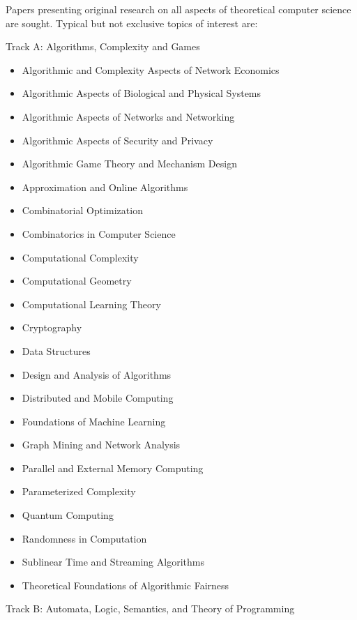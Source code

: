 \documentclass[prodmode,acmtecs]{acmsmall} %
\begin{document}
\begin{itemize}
  Papers presenting original research on all aspects of theoretical computer science are sought. Typical but not exclusive topics of interest are: 
 
  Track A: Algorithms, Complexity and Games 
 
\begin{itemize}\item  Algorithmic and Complexity Aspects of Network Economics
\item  Algorithmic Aspects of Biological and Physical Systems
\item  Algorithmic Aspects of Networks and Networking
\item  Algorithmic Aspects of Security and Privacy
\item  Algorithmic Game Theory and Mechanism Design
\item  Approximation and Online Algorithms
\item  Combinatorial Optimization
\item  Combinatorics in Computer Science
\item  Computational Complexity
\item  Computational Geometry
\item  Computational Learning Theory
\item  Cryptography
\item  Data Structures
\item  Design and Analysis of Algorithms
\item  Distributed and Mobile Computing
\item  Foundations of Machine Learning
\item  Graph Mining and Network Analysis
\item  Parallel and External Memory Computing
\item  Parameterized Complexity
\item  Quantum Computing
\item  Randomness in Computation
\item  Sublinear Time and Streaming Algorithms
\item  Theoretical Foundations of Algorithmic Fairness 
\end{itemize} 
  Track B: Automata, Logic, Semantics, and Theory of Programming 
 

\end{itemize}
\end{document}
